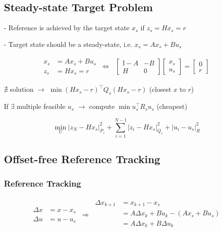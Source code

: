 
\subsection{Steady-state Target Problem}

- Reference is achieved by the target
state $x_s$ if $z_s = Hx_s = r$

- Target state should be a steady-state,
i.e. $x_s = Ax_s + Bu_s$

\begin{align*}
	\begin{aligned}
		x_s & = Ax_s + Bu_s \\
		z_s & = Hx_s = r
	\end{aligned}
	\ \Longleftrightarrow \
	\begin{aligned}
		\begin{bmatrix}
			\mathbb{I} - A & -B \\
			H              & 0
		\end{bmatrix}
		\begin{bmatrix}
			x_s \\
			u_s
		\end{bmatrix}
		=
		\begin{bmatrix}
			0 \\
			r
		\end{bmatrix}
	\end{aligned}
\end{align*}

$\nexists$ solution
$\rightarrow$
$\min (Hx_s - r)^\top Q_s (H x_s - r)$
(closest $x$ to $r$)

If $\exists$ multiple feasible $u_s$
$\rightarrow$
compute
$\min u_s^\top R_s u_s$
(cheapest)

$$
	\min_U |z_N - Hx_s|_{P_z}^2
	+ \sum_{i=1}^{N-1} | z_i - Hx_s |_{Q_z}^2
	+ | u_i - u_s |_{R}^2
$$

\subsection{Offset-free Reference Tracking}

\subsubsection{Reference Tracking}

\begin{align*}
	\begin{aligned}
		\Delta x & = x - x_s
		\\
		\Delta u & = u - u_s
	\end{aligned}
	\ \Rightarrow \
	\begin{aligned}
		\Delta x_{k+1}
		 & = x_{k+1} -x_s                          \\
		 & = A\Delta x_k + B u_k - (A x_s + B u_s) \\
		 & = A\Delta x_k + B\Delta u_k             \\
	\end{aligned}
\end{align*}

